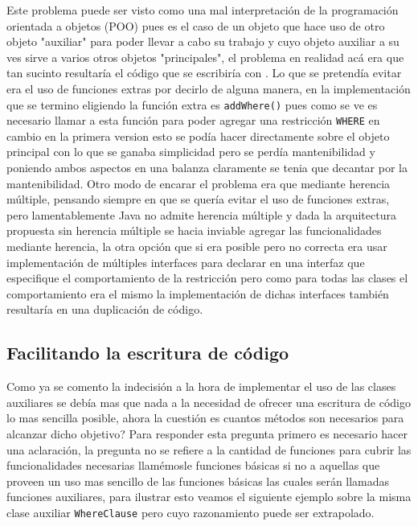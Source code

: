Este problema puede ser visto como una mal interpretación de la programación orientada a objetos (POO) pues es el caso de un objeto que hace uso de otro objeto "auxiliar" para poder llevar a cabo su trabajo y cuyo objeto auxiliar a su ves sirve a varios otros objetos "principales", el problema en realidad acá era que tan sucinto resultaría el código que se escribiría con \jj. Lo que se pretendía evitar era el uso de funciones extras por decirlo de alguna manera, en la implementación que se termino eligiendo la función extra es \verb=addWhere()= pues como se ve es necesario llamar a esta función para poder agregar una restricción \verb=WHERE= en cambio en la primera version esto se podía hacer directamente sobre el objeto principal con lo que se ganaba simplicidad pero se perdía mantenibilidad y poniendo ambos aspectos en una balanza claramente se tenia que decantar por la mantenibilidad. Otro modo de encarar el problema era que mediante herencia múltiple, pensando siempre en que se quería evitar el uso de funciones extras, pero lamentablemente Java no admite herencia múltiple\cite{java:jdbc:tutorial} y dada la arquitectura propuesta sin herencia múltiple se hacia inviable agregar las funcionalidades mediante herencia, la otra opción que si era posible pero no correcta era usar implementación de múltiples interfaces para declarar en una interfaz que especifique el comportamiento de la restricción pero como para todas las clases el comportamiento era el mismo la implementación de dichas interfaces también resultaría en una duplicación de código.
%
\subsection{Facilitando la escritura de código}
Como ya se comento la indecisión a la hora de implementar el uso de las clases auxiliares se debía mas que nada a la necesidad de ofrecer una escritura de código lo mas sencilla posible, ahora la cuestión es cuantos métodos son necesarios para alcanzar dicho objetivo? Para responder esta pregunta primero es necesario hacer una aclaración, la pregunta no se refiere a la cantidad de funciones para cubrir las funcionalidades necesarias llamémosle funciones básicas si no a aquellas que proveen un uso mas sencillo de las funciones básicas las cuales serán llamadas funciones auxiliares, para ilustrar esto veamos el siguiente ejemplo sobre la misma clase auxiliar \verb=WhereClause= pero cuyo razonamiento puede ser extrapolado.

